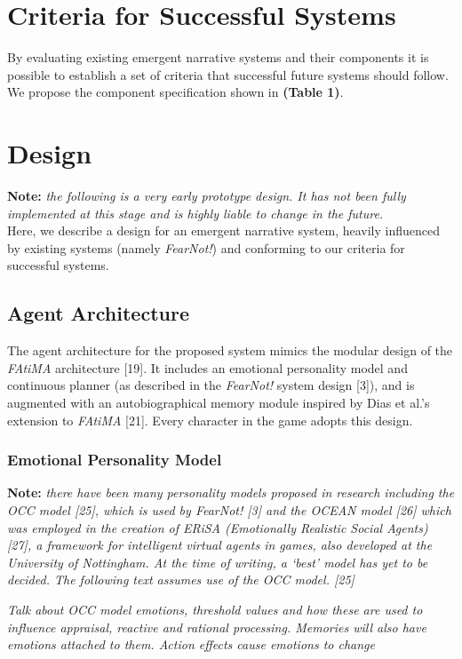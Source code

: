 \documentclass{sig-alternate-05-2015}
\begin{document}
\section{Criteria for Successful Systems}
\noindent By evaluating existing emergent narrative systems and their components it is possible to establish a set of criteria that successful future systems should follow. We propose the component specification shown in \textbf{(Table 1)}.

\section{Design}
\noindent \textbf{Note:} \textit{the following is a very early prototype design. It has not been fully implemented at this stage and is highly liable to change in the future.}\\

\newline \noindent Here, we describe a design for an emergent narrative system, heavily influenced by existing systems (namely \textit{FearNot!}) and conforming to our criteria for successful systems. 

\subsection{Agent Architecture}
\noindent The agent architecture for the proposed system mimics the modular design of the \textit{FAtiMA} architecture [19]. It includes an emotional personality model and continuous planner (as described in the \textit{FearNot!} system design [3]), and is augmented with an autobiographical memory module inspired by Dias et al.'s extension to \textit{FAtiMA} [21]. Every character in the game adopts this design.

\subsubsection{Emotional Personality Model}
\noindent \textbf{Note:} \textit{there have been many personality models proposed in research including the OCC model [25], which is used by \textit{FearNot!} [3] and the OCEAN model [26] which was employed in the creation of ERiSA (Emotionally Realistic Social Agents) [27], a framework for intelligent virtual agents in games, also developed at the University of Nottingham. At the time of writing, a `best' model has yet to be decided. The following text assumes use of the OCC model. [25]}

\textit{Talk about OCC model emotions, threshold values and how these are used to influence appraisal, reactive and rational processing. Memories will also have emotions attached to them. Action effects cause emotions to change}
\end{document}
